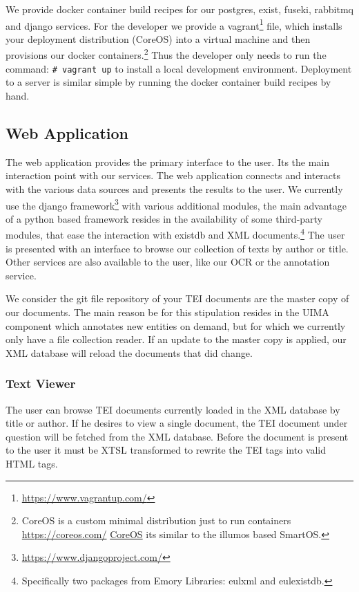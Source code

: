 \documentclass[12pt, draft]{article}
\begin{document}
We provide docker container build recipes for our
postgres, exist, fuseki, rabbitmq and django services.
For the developer we provide a vagrant\footnote{\url{https://www.vagrantup.com/}}
 file, which 
installs your deployment distribution (CoreOS)
into a virtual machine and then provisions our
docker containers.\footnote{CoreOS is a custom minimal distribution just to run
containers \url{https://coreos.com/} \href{https://coreos.com/}{CoreOS} its similar to the illumos based SmartOS.}
Thus the developer only needs to run the command: \lstinline´# vagrant up´
to install a local development environment.
Deployment to a server is similar simple by running the docker container build recipes
by hand.

\subsection{Web Application}

The web application provides the primary interface to the user. Its the main
interaction point with our services.
The web application connects and interacts with the various data sources and presents
the results to the user.
We currently use the django framework\footnote{\url{https://www.djangoproject.com/}}
 with various additional modules,
the main advantage of a python based framework resides in the availability
of some third-party modules, that ease the interaction with existdb and XML
documents.\footnote{Specifically two packages from Emory Libraries: eulxml and eulexistdb.}
The user is presented with an interface to browse our collection of texts by
author or title.  Other services are also available to the user, like our
OCR or the annotation service.

We consider the git file repository of your TEI documents are the master copy
of our documents.  The main reason be for this stipulation resides in the
UIMA component which annotates new entities on demand, but for which we
currently only have a file collection reader.  If an update to the master copy
is applied, our XML database will reload the documents that did change.

\subsubsection{Text Viewer}

The user can browse TEI documents currently loaded in the XML database by title
or author.  If he desires to view a single document, the TEI document under question
will be fetched from the XML database.  Before the document is present to the
user it must be XTSL transformed to rewrite the TEI tags into valid HTML
tags.
\end{document}

